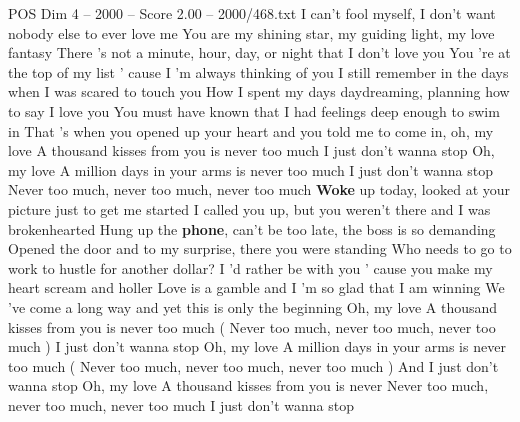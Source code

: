 \begin{textsample}{POS Dim 4 – 2000 – Score 2.00 – 2000/468.txt}  \label{ex:f4_pos_010}
I can't fool myself, I don't want nobody else to ever love me You are my shining star, my guiding light, my love fantasy There 's not a minute, hour, day, or night that I don't love you You 're at the top of my list ' cause I 'm always thinking of you I still remember in the days when I was scared to touch you How I spent my days daydreaming, planning how to say I love you You must have known that I had feelings deep enough to swim in That 's when you opened up your heart and you told me to come in, oh, my love A thousand kisses from you is never too much I just don't wanna stop Oh, my love A million days in your arms is never too much I just don't wanna stop Never too much, never too much, never too much \textbf{Woke} up today, looked at your picture just to get me started I called you up, but you weren't there and I was brokenhearted Hung up the \textbf{phone}, can't be too late, the boss is so demanding Opened the door and to my surprise, there you were standing Who needs to go to work to hustle for another dollar?
I 'd rather be with you ' cause you make my heart scream and holler Love is a gamble and I 'm so glad that I am winning We 've come a long way and yet this is only the beginning Oh, my love A thousand kisses from you is never too much ( Never too much, never too much, never too much ) I just don't wanna stop Oh, my love A million days in your arms is never too much ( Never too much, never too much, never too much ) And I just don't wanna stop Oh, my love A thousand kisses from you is never Never too much, never too much, never too much I just don't wanna stop

\end{textsample}
